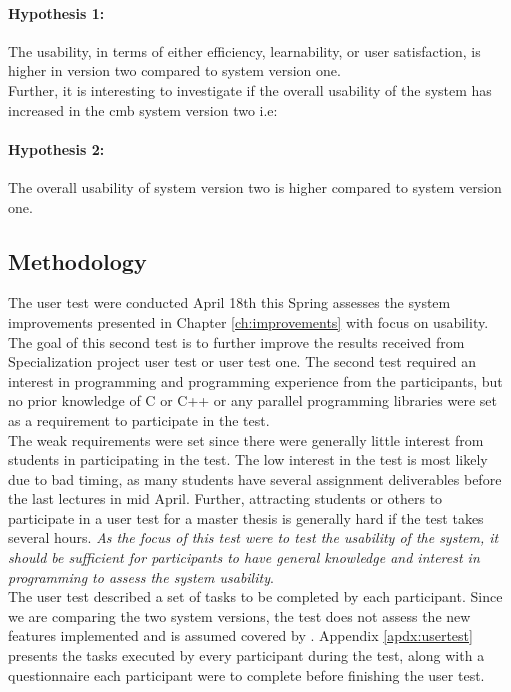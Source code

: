 \paragraph*{Hypothesis 1:} The usability, in terms of either efficiency, learnability, or user satisfaction, is higher in version two compared to system version one. \hfill \\

Further, it is interesting to investigate if the overall usability of the system has increased in the \gls{cmb} system version two i.e:

\paragraph*{Hypothesis 2:} The overall usability of system version two is higher compared to system version one. \hfill \\

\subsection{Methodology}
\label{sub-sec:user-testing-methodology}
The user test were conducted April 18th this Spring assesses the system improvements presented in Chapter \ref{ch:improvements} with focus on usability. The goal of this second test is to further improve the results received from Specialization project user test or user test one. The second test required an interest in programming and programming experience from the participants, but no prior knowledge of C or C++ or any parallel programming libraries were set as a requirement to participate in the test. \\

The weak requirements were set since there were generally little interest from students in participating in the test. The low interest in the test is most likely due to bad timing, as many students have several assignment deliverables before the last lectures in mid April. Further, attracting students or others to participate in a user test for a master thesis is generally hard if the test takes several hours. \textit{As the focus of this test were to test the usability of the system, it should be sufficient for participants to have general knowledge and interest in programming to assess the system usability}. \\

The user test described a set of tasks to be completed by each participant. Since we are comparing the two system versions, the test does not assess the new features implemented and is assumed covered by . Appendix \ref{apdx:usertest} presents the tasks executed by every participant during the test, along with a questionnaire each participant were to complete before finishing the user test. \\

